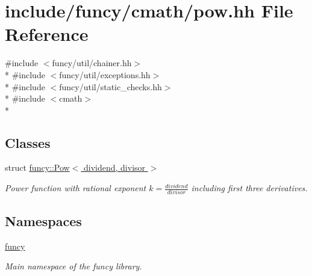 \hypertarget{pow_8hh}{\section{include/funcy/cmath/pow.hh File Reference}
\label{pow_8hh}
}
{\ttfamily \#include $<$funcy/util/chainer.\-hh$>$}\\*
{\ttfamily \#include $<$funcy/util/exceptions.\-hh$>$}\\*
{\ttfamily \#include $<$funcy/util/static\-\_\-checks.\-hh$>$}\\*
{\ttfamily \#include $<$cmath$>$}\\*
\subsection*{Classes}
\begin{DoxyCompactItemize}
\item 
struct \hyperlink{structfuncy_1_1Pow}{funcy\-::\-Pow$<$ dividend, divisor $>$}
\begin{DoxyCompactList}\small\item\em Power function with rational exponent $ k = \frac{dividend}{divisor} $ including first three derivatives. \end{DoxyCompactList}\end{DoxyCompactItemize}
\subsection*{Namespaces}
\begin{DoxyCompactItemize}
\item 
\hyperlink{namespacefuncy}{funcy}
\begin{DoxyCompactList}\small\item\em Main namespace of the funcy library. \end{DoxyCompactList}\end{DoxyCompactItemize}
